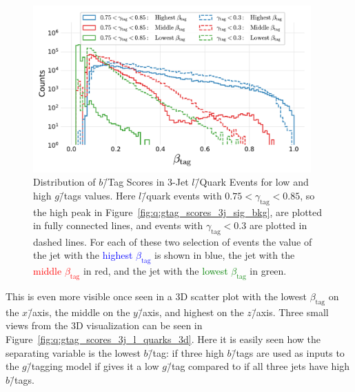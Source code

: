 \begin{figure}[h!]
  \centerfloat
  \includegraphics[width=0.95\textwidth, trim=10 10 10 10, clip]{figures/quarks/leptons_high_g_tag_3j_0.75_gtag_0.85-down_sample=1.00-ML_vars=vertex-selection=b-ejet_min=4-n_iter_RS_lgb=99-n_iter_RS_xgb=9-cdot_cut=0.90-version=19.pdf}
  \caption[Distribution of $b$\=/Tag Scores in 3-Jet $l$\=/Quark Events for Low and High $g$\=/Tag Values]
          {Distribution of $b$\=/Tag Scores in 3-Jet $l$\=/Quark Events for low and high $g$\=/tags values. Here $l$\=/quark events with $0.75 < \gamma_\mathrm{tag} <  0.85$, so the high peak in Figure~\ref{fig:q:gtag_scores_3j_sig_bkg}, are plotted in fully connected lines, and events with $\gamma_\mathrm{tag} <  0.3$ are plotted in dashed lines. For each of these two selection of events the value of the jet with the \textcolor{blue}{highest $\beta_\mathrm{tag}$} is shown in blue, the jet with the \textcolor{red}{middle $\beta_\mathrm{tag}$} in red, and the jet with the \textcolor{green}{lowest $\beta_\mathrm{tag}$} in green.} 
  \label{fig:q:gtag_scores_3j_l_quarks}
\end{figure}

This is even more visible once seen in a 3D scatter plot with the lowest $\beta_\mathrm{tag}$ on the $x$\=/axis, the middle on the $y$\=/axis, and highest on the $z$\=/axis. Three small views from the 3D visualization can be seen in Figure~\ref{fig:q:gtag_scores_3j_l_quarks_3d}. Here it is easily seen how the separating variable is the lowest $b$\=/tag: if three high $b$\=/tags are used as inputs to the $g$\=/tagging model if gives it a low $g$\=/tag compared to if all three jets have high $b$\=/tags.

